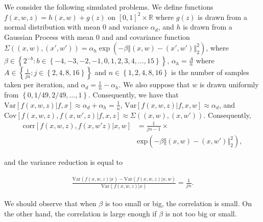 \documentclass{article}
\newcommand{\w}{w}
\newcommand{\z}{z}
\begin{document}
We consider the following simulated problems. We define functions $f(x,\w,\z)=h(x,\w)+g(\z)$ on $\left[0,1\right]^{2}\times\mathbb{R}$ where $g(z)$ is drawn from a normal distribution with mean $0$ and variance $\alpha_{d}$, and $h$ is drawn from a Gaussian Process with mean $0$ and and covariance function $\Sigma\left(\left(x,\w\right),\left(x',\w'\right)\right)=\alpha_{h}\exp\left(-\beta\left\Vert \left(x,\w\right)-\left(x',\w'\right)\right\Vert _{2}^{2}\right)$, where $\beta\in\left\{ 2^{-b}:b\in\left\{ -4,-3,-2,-1,0,1,2,3,4,\ldots,15\right\} \right\} $, $\alpha_{h}=\frac{A}{n}$ where $A\in\left\{ \frac{1}{jn}:j\in\left\{ 2,4,8,16\right\} \right\} $ and $n\in\left\{ 1,2,4,8,16\right\} $ is the number of samples taken per iteration, and $\alpha_{d}=\frac{1}{n}-\alpha_{h}$. We also suppose that 
$\w$ is drawn uniformly from $\left\{ 0,1/49,2/49,\ldots,1\right\} $. Consequently, we have that $\mbox{Var}\left[f\left(x,\w,\z\right)|f,x\right]\approx\alpha_{d}+\alpha_{h}=\frac{1}{n}$, $\mbox{Var}\left[f\left(x,\w,\z\right)|f,x,\w\right]\approx\alpha_{d}$, and $\mbox{Cov}\left[f\left(x,\w,\z\right),f\left(x,\w',\z\right)|f,x,z\right]\approx\Sigma\left(\left(x,\w\right),\left(x,\w'\right)\right)$. Consequently,
\begin{align*}
\mbox{corr}\left[f\left(x,w,z\right),f\left(x,w'z\right)|x,w\right]&=\frac{1}{jn-1}\times\\  
&\mbox{exp}\left(-\beta\left\Vert \left(x,w\right)-\left(x,w'\right)\right\Vert _{2}^{2}\right),
\end{align*}

and the variance reduction is equal to

\begin{align*}
\frac{\mbox{Var}\left(f\left(x,w,z\right)|x\right)-\mbox{Var}\left(f\left(x,w,z\right)|x,w\right)}{\mbox{Var}\left(f\left(x,w,z\right)|x\right)}=\frac{1}{jn}.
\end{align*}

We should observe that when $\beta$ is too small or big, the correlation is small. On the other hand, the correlation is large enough if $\beta$ is not too big or small. 
\end{document}
